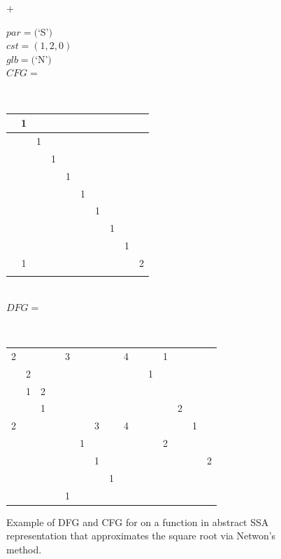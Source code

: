 \begin{figure}[h]
\begin{minipage}{0.04\textwidth}
\centering
$+$
\end{minipage}
\begin{minipage}{0.27\textwidth}
$par=($`S'$)$\\
$cst=(1,2,0)$\\
$glb=($`N'$)$\\
$CFG=$\\[1pt]{
\tiny\tt\bf
\setlength{\tabcolsep}{1pt}
\renewcommand{\arraystretch}{0.7}
\begin{tabular}{|c|c|c|c|c|c|c|c|c|c|}
\hline
\hphantom{1}&1&&&&&&&&\\[-0.5mm]
\hline
&&1&&&&&&&\\[-0.5mm]
\hline
&&&1&&&&&&\\[-0.5mm]
\hline
&&&&1&&&&&\\[-0.5mm]
\hline
&&&&&1&&&&\\[-0.5mm]
\hline
&&&&&&1&&&\\[-0.5mm]
\hline
&&&&&&&1&&\\[-0.5mm]
\hline
&&&&&&&&1&\\[-0.5mm]
\hline
&1&&&&&&&&2\\[-0.5mm]
\hline
&&&&&&&&&\\
\hline
\end{tabular}}\\[0.75em]
$DFG=$\\[1pt]{
\tiny\tt\bf
\setlength{\tabcolsep}{1pt}
\renewcommand{\arraystretch}{0.7}
\begin{tabular}{|c|c|c|c|c|c|c|c|c|c||c||c|c|c||c|}
\hline
\hphantom{1}&&&\hphantom{1}&&&&&\hphantom{1}&\hphantom{1}&&&&&\\
\hline
2&&&&3&&&&4&&&1&&&\\[-0.5mm]
\hline
&2&&&&&&&&&1&&&&\\[-0.5mm]
\hline
&1&2&&&&&&&&&&&&\\[-0.5mm]
\hline
&&1&&&&&&&&&&2&&\\[-0.5mm]
\hline
2&&&&&&3&&4&&&&&1&\\[-0.5mm]
\hline
&&&&&1&&&&&&2&&&\\[-0.5mm]
\hline
&&&&&&1&&&&&&&&2\\[-0.5mm]
\hline
&&&&&&&1&&&&&&&\\[-0.5mm]
\hline
&&&&1&&&&&&&&&&\\
\hline
\end{tabular}}
\end{minipage}

\caption{Example of DFG and CFG for on a function in abstract SSA representation
         that approximates the square root via Netwon's method.}
\label{fig:separation}
\end{figure}

